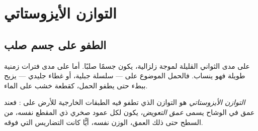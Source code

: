 \section{التوازن الأيزوستاتي}

\subsection{الطفو على جسم صلب}

على مدى الثواني القليلة لموجة زلزالية، يكون  جسمًا صلبًا. أما على
مدى فترات زمنية طويلة فهو ينساب. فالحمل الموضوع على  --- سلسلة
جبلية، أو غطاء جليدي --- يزيح  ببطء حتى يطفو
الحمل، كقطعة خشب على الماء.

\begin{definition}\label{def:g11:lithosphere-asthenosphere:isostasy}
\emph{التوازن الأيزوستاتي} هو التوازن الذي تطفو فيه الطبقات الخارجية
للأرض على : فعند عمق في الوشاح يسمى
\emph{عمق التعويض}، يكون لكل عمود صخري ذي
المقطع نفسه، من السطح حتى ذلك العمق، الوزن
نفسه، أيًّا كانت التضاريس التي فوقه.
\end{definition}

